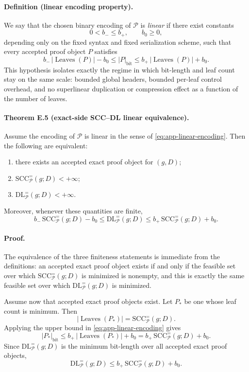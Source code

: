 \paragraph{Definition (linear encoding property).}
We say that the chosen binary encoding of $\mathcal P$ is \emph{linear} if there exist constants
\[
0<b_-\le b_+,
\qquad
b_0\ge 0,
\]
depending only on the fixed syntax and fixed serialization scheme, such that every accepted proof object $P$ satisfies
\begin{equation}
 b_-\,|\operatorname{Leaves}(P)|-b_0
 \le
 |P|_{\mathrm{bit}}
 \le
 b_+\,|\operatorname{Leaves}(P)|+b_0.
 \label{eq:app-linear-encoding}
\end{equation}
This hypothesis isolates exactly the regime in which bit-length and leaf count stay on the same scale: bounded global headers, bounded per-leaf control overhead, and no superlinear duplication or compression effect as a function of the number of leaves.

\paragraph{Theorem E.5 (exact-side SCC--DL linear equivalence).}
Assume the encoding of $\mathcal P$ is linear in the sense of \eqref{eq:app-linear-encoding}. Then the following are equivalent:
\begin{enumerate}
    \item there exists an accepted exact proof object for $(g,D)$;
    \item $\mathrm{SCC}^{=}_{\mathcal P}(g;D)<+\infty$;
    \item $\mathrm{DL}^{=}_{\mathcal P}(g;D)<+\infty$.
\end{enumerate}
Moreover, whenever these quantities are finite,
\[
 b_-\,\mathrm{SCC}^{=}_{\mathcal P}(g;D)-b_0
 \le
 \mathrm{DL}^{=}_{\mathcal P}(g;D)
 \le
 b_+\,\mathrm{SCC}^{=}_{\mathcal P}(g;D)+b_0.
\]

\paragraph{Proof.}
The equivalence of the three finiteness statements is immediate from the definitions: an accepted exact proof object exists if and only if the feasible set over which $\mathrm{SCC}^{=}_{\mathcal P}(g;D)$ is minimized is nonempty, and this is exactly the same feasible set over which $\mathrm{DL}^{=}_{\mathcal P}(g;D)$ is minimized.

Assume now that accepted exact proof objects exist. Let $P_\ast$ be one whose leaf count is minimum. Then
\[
|\operatorname{Leaves}(P_\ast)|=\mathrm{SCC}^{=}_{\mathcal P}(g;D).
\]
Applying the upper bound in \eqref{eq:app-linear-encoding} gives
\[
|P_\ast|_{\mathrm{bit}}
\le
b_+\,|\operatorname{Leaves}(P_\ast)|+b_0
=
b_+\,\mathrm{SCC}^{=}_{\mathcal P}(g;D)+b_0.
\]
Since $\mathrm{DL}^{=}_{\mathcal P}(g;D)$ is the minimum bit-length over all accepted exact proof objects,
\[
\mathrm{DL}^{=}_{\mathcal P}(g;D)
\le
b_+\,\mathrm{SCC}^{=}_{\mathcal P}(g;D)+b_0.
\]

